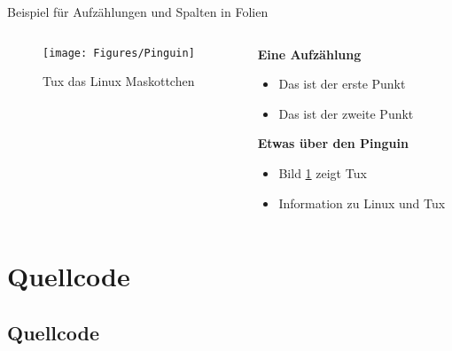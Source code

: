\documentclass[mathserif,serif,german]{beamer}
\begin{document}
\begin{frame}{Beispiel für Aufzählungen und Spalten in Folien}
	
	\begin{columns}
		
		\begin{column}{6cm}
			\flushleft
			\begin{figure}
				\centering
				\texttt{[image: Figures/Pinguin]}
				\caption[Pinguin]{Tux das Linux Maskottchen }
				\label{fig:Tux}
			\end{figure}
		
		\end{column}
	
		\begin{column}{6cm}
		
			\textbf{Eine Aufzählung}
			\begin{itemize}
				\item Das ist der erste Punkt
				\item Das ist der zweite Punkt
			\end{itemize}
		
			\textbf{Etwas über den Pinguin}
			\begin{itemize}
				\item Bild \ref{fig:Tux} zeigt Tux
				\item Information zu Linux und Tux \cite{Linux_Wiki,Tux_Maskottchen}
			\end{itemize}
			
		\end{column}
	
	\end{columns}	

\end{frame}


\section{Quellcode}
\subsection{Quellcode}
\end{document}
